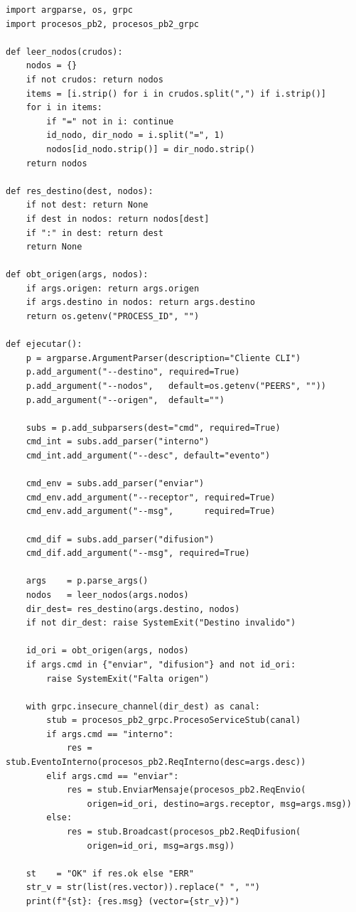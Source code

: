 \documentclass[letterpaper,11pt]{article}
\begin{document}
\begin{lstlisting}[style=python, caption={cli.py — Cliente de línea de comandos}]
import argparse, os, grpc
import procesos_pb2, procesos_pb2_grpc
 
def leer_nodos(crudos):
    nodos = {}
    if not crudos: return nodos
    items = [i.strip() for i in crudos.split(",") if i.strip()]
    for i in items:
        if "=" not in i: continue
        id_nodo, dir_nodo = i.split("=", 1)
        nodos[id_nodo.strip()] = dir_nodo.strip()
    return nodos
 
def res_destino(dest, nodos):
    if not dest: return None
    if dest in nodos: return nodos[dest]
    if ":" in dest: return dest
    return None
 
def obt_origen(args, nodos):
    if args.origen: return args.origen
    if args.destino in nodos: return args.destino
    return os.getenv("PROCESS_ID", "")
 
def ejecutar():
    p = argparse.ArgumentParser(description="Cliente CLI")
    p.add_argument("--destino", required=True)
    p.add_argument("--nodos",   default=os.getenv("PEERS", ""))
    p.add_argument("--origen",  default="")
 
    subs = p.add_subparsers(dest="cmd", required=True)
    cmd_int = subs.add_parser("interno")
    cmd_int.add_argument("--desc", default="evento")
 
    cmd_env = subs.add_parser("enviar")
    cmd_env.add_argument("--receptor", required=True)
    cmd_env.add_argument("--msg",      required=True)
 
    cmd_dif = subs.add_parser("difusion")
    cmd_dif.add_argument("--msg", required=True)
 
    args    = p.parse_args()
    nodos   = leer_nodos(args.nodos)
    dir_dest= res_destino(args.destino, nodos)
    if not dir_dest: raise SystemExit("Destino invalido")
 
    id_ori = obt_origen(args, nodos)
    if args.cmd in {"enviar", "difusion"} and not id_ori:
        raise SystemExit("Falta origen")
 
    with grpc.insecure_channel(dir_dest) as canal:
        stub = procesos_pb2_grpc.ProcesoServiceStub(canal)
        if args.cmd == "interno":
            res = stub.EventoInterno(procesos_pb2.ReqInterno(desc=args.desc))
        elif args.cmd == "enviar":
            res = stub.EnviarMensaje(procesos_pb2.ReqEnvio(
                origen=id_ori, destino=args.receptor, msg=args.msg))
        else:
            res = stub.Broadcast(procesos_pb2.ReqDifusion(
                origen=id_ori, msg=args.msg))
 
    st    = "OK" if res.ok else "ERR"
    str_v = str(list(res.vector)).replace(" ", "")
    print(f"{st}: {res.msg} (vector={str_v})")
\end{lstlisting}
\end{document}
